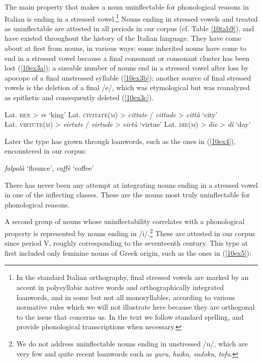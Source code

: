 \documentclass[output=paper,colorlinks,citecolor=brown]{langscibook}
\begin{document}
The main property that makes a noun uninflectable for phonological reasons in Italian is ending in a stressed vowel.\footnote{In the standard Italian orthography, final stressed vowels are marked by an accent in polysyllabic native words and orthographically integrated loanwords, and in some but not all monosyllables, according to various normative rules which we will not illustrate here because they are orthogonal to the issue that concerns us. In the text we follow standard spelling, and provide phonological transcriptions when necessary.} Nouns ending in stressed vowels and treated as uninflectable are attested in all periods in our corpus (cf. Table \ref{10tab9}), and have existed throughout the history of the Italian language. They have come about at first from  nouns, in various ways: some inherited nouns have come to end in a stressed vowel because a final consonant or consonant cluster has been lost (\ref{10ex3a}); a sizeable number of nouns end in a stressed vowel after loss by apocope of a final unstressed syllable (\ref{10ex3b}); another source of final stressed vowels is the deletion of a final /e/, which was etymological but was reanalyzed as epithetic and consequently deleted (\ref{10ex3c}).

\begin{exe}
	\ex \label{10ex3}
	\begin{xlist}
		\ex \label{10ex3a} Lat. \textsc{rex} > \emph{re} ‘king’
		\ex \label{10ex3b} Lat. \textsc{civitate(m)} > \emph{cittate} / \emph{cittade} > \emph{città} ‘city’ \\
		Lat. \textsc{virtute(m)} > \emph{virtute} / \emph{virtude} > \emph{virtù} ‘virtue’
		\ex \label{10ex3c} Lat. \textsc{die(m)} > \emph{die} > \emph{dì} ‘day’
	\end{xlist}
\end{exe}

Later the type has grown through loanwords, such as the ones in (\ref{10ex4}),
encountered in our corpus:

\begin{exe}
	\ex \label{10ex4}
		\emph{falpalà} ‘flounce’, \emph{caffè} ‘coffee’ 
\end{exe}

There has never been any attempt at integrating nouns ending in a stressed vowel in one of the inflecting classes. These are the nouns most truly uninflectable for phonological reasons.

A second group of nouns whose uninflectability correlates with a phonological property is represented by nouns ending in /i/.\footnote{We do not address uninflectable nouns ending in unstressed /u/, which are very few and quite recent loanwords such as \emph{guru}, \emph{haiku}, \emph{sudoku}, \emph{tofu}.} These are attested in our corpus since period V, roughly corresponding to the seventeenth century. This type at first included only feminine nouns of Greek origin, such as the ones in (\ref{10ex5}):
\end{document}
